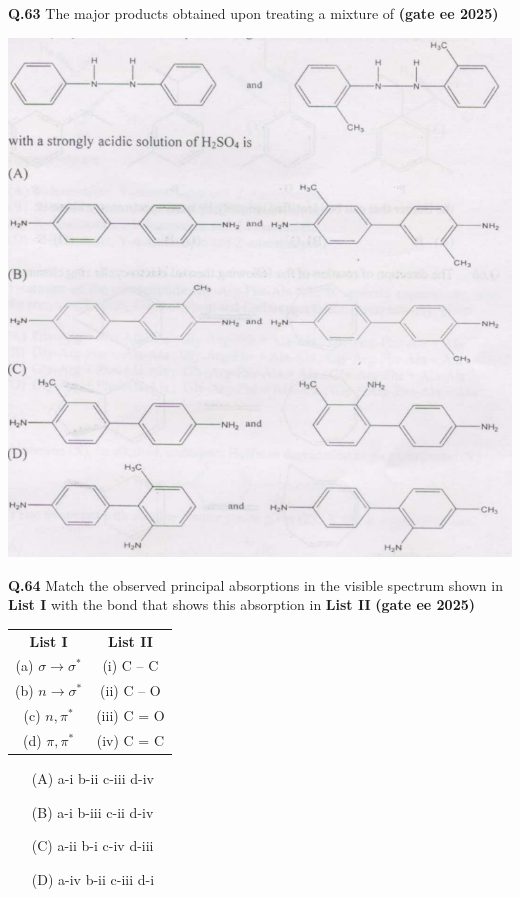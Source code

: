 \documentclass[journal,12pt,onecolumn]{exam}
\theoremstyle{remark}
\begin{document}
\noindent\textbf{Q.63} The major products obtained upon treating a mixture of \hfill{\textbf{(gate ee 2025)}}

\includegraphics[scale=1]{images/image7.png} 
\vspace{1 cm}

\noindent\textbf{Q.64} Match the observed principal absorptions in the visible spectrum shown in \textbf{List I} with the bond that shows this absorption in \textbf{List II} \hfill{\textbf{(gate ee 2025)}}

\begin{center}
\begin{tabular}{c@{\hspace{3cm}}c}
\textbf{List I} & \textbf{List II} \\
(a) $\sigma \rightarrow \sigma^*$ & (i) C -- C \\
(b) $n \rightarrow \sigma^*$ & (ii) C -- O \\
(c) $n, \pi^*$ & (iii) C = O \\
(d) $\pi, \pi^*$ & (iv) C = C \\
\end{tabular}
\end{center}

\begin{multicols}{2}
\begin{itemize}
    \item[(A)] a-i \quad b-ii \quad c-iii \quad d-iv
    \item[(B)] a-i \quad b-iii \quad c-ii \quad d-iv
    \item[(C)] a-ii \quad b-i \quad c-iv \quad d-iii
    \item[(D)] a-iv \quad b-ii \quad c-iii \quad d-i
\end{itemize}
\end{multicols}
\vspace{1 cm}
\end{document}
